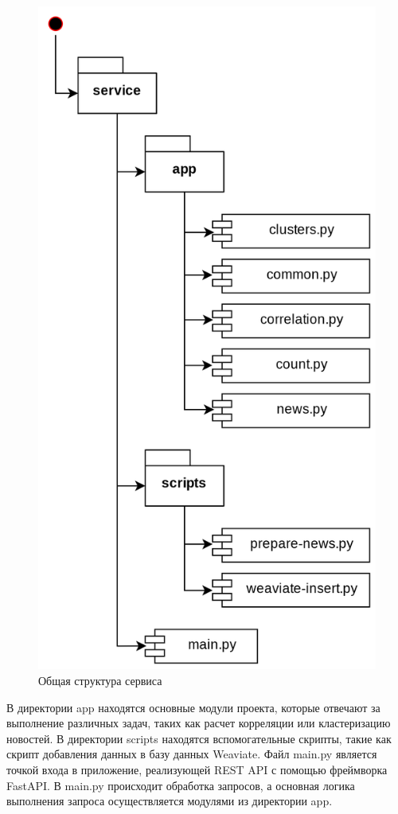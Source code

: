 \begin{figure}[h]
    \centering
    \includegraphics{images/service-struct.png}
    \caption{Общая структура сервиса}
    \label{img:service-struct}
\end{figure}

В директории app находятся основные модули проекта, которые отвечают за выполнение различных задач, таких как расчет корреляции или кластеризацию новостей. В директории scripts находятся вспомогательные скрипты, такие как скрипт добавления данных в базу данных Weaviate. Файл main.py является точкой входа в приложение, реализующей REST API с помощью фреймворка FastAPI. В main.py происходит обработка запросов, а основная логика выполнения запроса осуществляется модулями из директории app.

